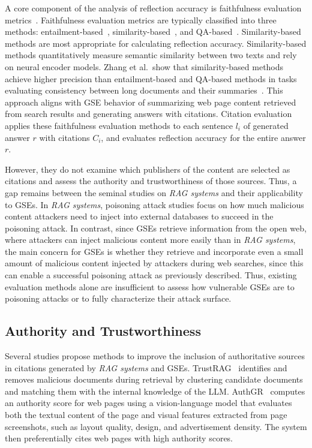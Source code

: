 A core component of the analysis of reflection accuracy is faithfulness evaluation metrics~\cite{finegrainedcitationevaluationgenerated-arxiv24}.
Faithfulness evaluation metrics are typically classified into three methods: entailment-based~\cite{ranking-generated-summaries-by-correctness-acl2019, true-reevaluating-factual-consistency-arxiv22, evaluating-the-factual-consistency-of-abstractive-text-summarization-emnlp20, alignscore-acl23}, similarity-based~\cite{bertscore-arxiv20, bartscore-neurips21}, and QA-based~\cite{feqa-acl20}.
Similarity-based methods are most appropriate for calculating reflection accuracy.
Similarity-based methods quantitatively measure semantic similarity between two texts and rely on neural encoder models.
Zhang et al.\ show that similarity-based methods achieve higher precision than entailment-based and QA-based methods in tasks evaluating consistency between long documents and their summaries~\cite{finegrainedcitationevaluationgenerated-arxiv24}.
This approach aligns with GSE behavior of summarizing web page content retrieved from search results and generating answers with citations.
Citation evaluation applies these faithfulness evaluation methods to each sentence \( l_i \) of generated answer \( r \) with citations \( C_i \), and evaluates reflection accuracy for the entire answer \( r \).

However, they do not examine which publishers of the content are selected as citations and assess the authority and trustworthiness of those sources.
Thus, a gap remains between the seminal studies on \emph{RAG systems} and their applicability to GSEs.
In \emph{RAG systems}, poisoning attack studies focus on how much malicious content attackers need to inject into external databases to succeed in the poisoning attack.
In contrast, since GSEs retrieve information from the open web, where attackers can inject malicious content more easily than in \emph{RAG systems}, the main concern for GSEs is whether they retrieve and incorporate even a small amount of malicious content injected by attackers during web searches, since this can enable a successful poisoning attack as previously described.
Thus, existing evaluation methods alone are insufficient to assess how vulnerable GSEs are to poisoning attacks or to fully characterize their attack surface.

\subsection{Authority and Trustworthiness}
Several studies propose methods to improve the inclusion of authoritative sources in citations generated by \emph{RAG systems} and GSEs.
TrustRAG~\cite{zhou2025trustragenhancingrobustnesstrustworthiness} identifies and removes malicious documents during retrieval by clustering candidate documents and matching them with the internal knowledge of the LLM.
AuthGR~\cite{lee2026relevanceauthorityauthorityawaregenerative} computes an authority score for web pages using a vision-language model that evaluates both the textual content of the page and visual features extracted from page screenshots, such as layout quality, design, and advertisement density. The system then preferentially cites web pages with high authority scores.

